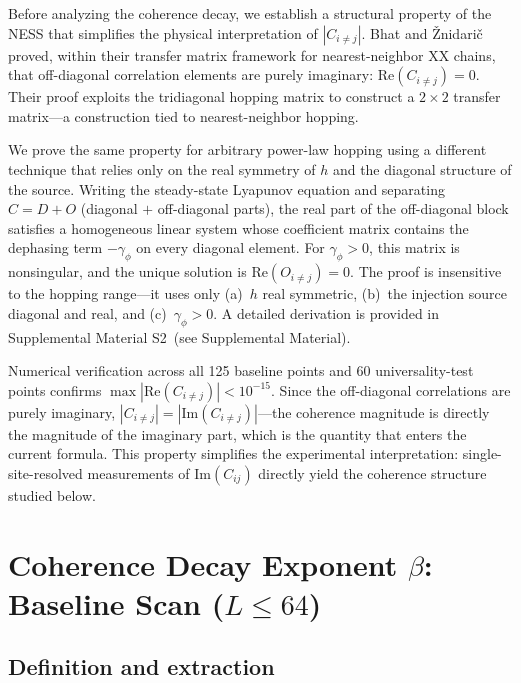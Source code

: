 \documentclass[aps,prb,twocolumn,superscriptaddress,floatfix]{revtex4-2}
\begin{document}
Before analyzing the coherence decay, we establish a structural property of the NESS that simplifies the physical interpretation of $|C_{i\neq j}|$. Bhat and \v{Z}nidari\v{c}~\cite{Bhat2025} proved, within their transfer matrix framework for nearest-neighbor XX chains, that off-diagonal correlation elements are purely imaginary: $\mathrm{Re}(C_{i\neq j}) = 0$. Their proof exploits the tridiagonal hopping matrix to construct a $2 \times 2$ transfer matrix---a construction tied to nearest-neighbor hopping.

We prove the same property for arbitrary power-law hopping using a different technique that relies only on the real symmetry of $h$ and the diagonal structure of the source. Writing the steady-state Lyapunov equation and separating $C = D + O$ (diagonal $+$ off-diagonal parts), the real part of the off-diagonal block satisfies a homogeneous linear system whose coefficient matrix contains the dephasing term $-\gamma_\phi$ on every diagonal element. For $\gamma_\phi > 0$, this matrix is nonsingular, and the unique solution is $\mathrm{Re}(O_{i\neq j}) = 0$. The proof is insensitive to the hopping range---it uses only (a)~$h$ real symmetric, (b)~the injection source diagonal and real, and (c)~$\gamma_\phi > 0$. A detailed derivation is provided in Supplemental Material S2~(see Supplemental Material).

Numerical verification across all 125 baseline points and 60 universality-test points confirms $\max|\mathrm{Re}(C_{i\neq j})| < 10^{-15}$. Since the off-diagonal correlations are purely imaginary, $|C_{i\neq j}| = |\mathrm{Im}(C_{i\neq j})|$---the coherence magnitude is directly the magnitude of the imaginary part, which is the quantity that enters the current formula. This property simplifies the experimental interpretation: single-site-resolved measurements of $\mathrm{Im}(C_{ij})$ directly yield the coherence structure studied below.

\section{Coherence Decay Exponent $\beta$: Baseline Scan ($L \le 64$)}
\label{sec:beta}

\subsection{Definition and extraction}
\label{sec:beta_def}
\end{document}
